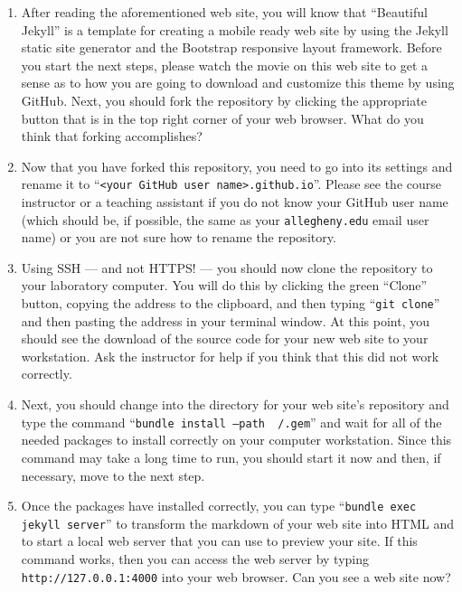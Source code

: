 \vspace*{-.15in}
\begin{enumerate}

  \itemsep0in

  \item After reading the aforementioned web site, you will know that ``Beautiful Jekyll'' is a template for creating a
    mobile ready web site by using the Jekyll static site generator and the Bootstrap responsive layout framework.
    Before you start the next steps, please watch the movie on this web site to get a sense as to how you are going to
    download and customize this theme by using GitHub. Next, you should fork the repository by clicking the appropriate
    button that is in the top right corner of your web browser. What do you think that forking accomplishes?

  \item Now that you have forked this repository, you need to go into its settings and rename it to ``{\tt <your GitHub
    user name>.github.io}''. Please see the course instructor or a teaching assistant if you do not know your GitHub
    user name (which should be, if possible, the same as your {\tt allegheny.edu} email user name) or you are not sure
    how to rename the repository.

  \item Using SSH --- and not HTTPS! --- you should now clone the repository to your laboratory computer. You will do
    this by clicking the green ``Clone'' button, copying the address to the clipboard, and then typing ``{\tt git
    clone}'' and then pasting the address in your terminal window. At this point, you should see the download of the
    source code for your new web site to your workstation. Ask the instructor for help if you think that this did not
    work correctly.

  \item Next, you should change into the directory for your web site's repository and type the command ``{\tt bundle
    install --path ~/.gem}'' and wait for all of the needed packages to install correctly on your computer workstation.
    Since this command may take a long time to run, you should start it now and then, if necessary, move to the next
    step.

  \item Once the packages have installed correctly, you can type ``{\tt bundle exec jekyll server}'' to transform the
    markdown of your web site into HTML and to start a local web server that you can use to preview your site. If this
    command works, then you can access the web server by typing {\tt http://127.0.0.1:4000} into your web browser. Can
    you see a web site now?


\end{enumerate}
